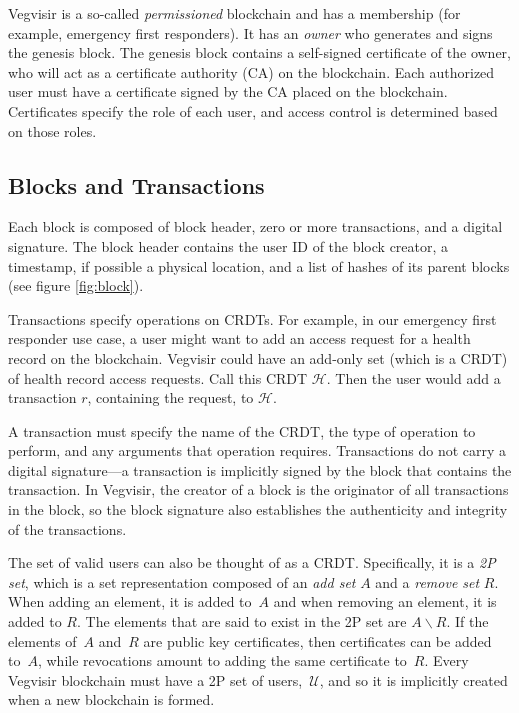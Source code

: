 \documentclass[conference, letterpaper]{IEEEtran}
\begin{document}
Vegvisir is a so-called \emph{permissioned} blockchain and has a membership (for example, emergency first responders). It has an \emph{owner} who generates and signs the genesis block. The genesis block contains a self-signed certificate of the owner, who will act as a certificate authority (CA) on the blockchain. Each authorized user must have a certificate signed by the CA placed on the blockchain. Certificates specify the role of each user, and access control is determined based on those roles. 

\subsection{Blocks and Transactions}

Each block is composed of block header, zero or more transactions, and a digital signature. The block header contains the user ID of the block creator, a timestamp, if possible a physical location, and a list of hashes of its parent blocks (see figure \ref{fig:block}).

Transactions specify operations on CRDTs. For example, in our emergency first responder use case, a user might want to add an access request for a health record on the blockchain. Vegvisir could have an add-only set (which is a CRDT) of health record access requests. Call this CRDT $\mathcal{H}$. Then the user would add a transaction $r$, containing the request, to $\mathcal{H}$. 

A transaction must specify the name of the CRDT, the type of operation to perform, and any arguments that operation requires. Transactions do not carry a digital signature---a transaction is implicitly signed by the block that contains the transaction. In Vegvisir, the creator of a block is the originator of all transactions in the block, so the block signature also establishes the authenticity and integrity of the transactions.

The set of valid users can also be thought of as a CRDT. Specifically, it is a \emph{2P set}, which is a set representation composed of an \emph{add set} $A$ and a \emph{remove set} $R$. When adding an element, it is added to~$A$ and when removing an element, it is added to $R$. The elements that are said to exist in the 2P set are $A \backslash R$. If the elements of~$A$ and~$R$ are public key certificates, then certificates can be added to~$A$, while revocations amount to adding the same certificate to~$R$. Every Vegvisir blockchain must have a 2P set of users,~$\mathcal{U}$, and so it is implicitly created when a new blockchain is formed. 
\end{document}
